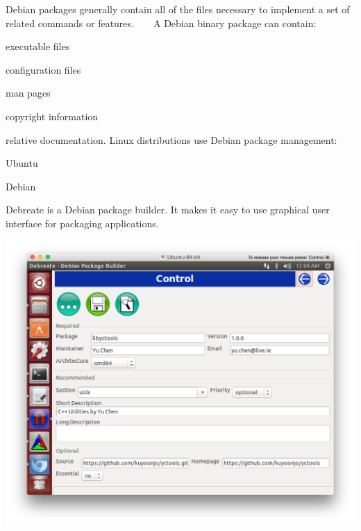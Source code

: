 Debian packages generally contain all of the files necessary to implement a set of related commands or features. ~\newline
~\newline
A Debian binary package can contain\+:
\begin{DoxyItemize}
\item executable files
\item configuration files
\item man pages
\item copyright information
\item relative documentation. Linux distributions use Debian package management\+:
\item Ubuntu
\item Debian
\end{DoxyItemize}

Debreate is a Debian package builder. It makes it easy to use graphical user interface for packaging applications. \cite{debreate} 
\begin{DoxyImageNoCaption}
  \mbox{\includegraphics[width=\textwidth,height=\textheight/2,keepaspectratio=true]{ResearchDebreate.png}}
\end{DoxyImageNoCaption}
 